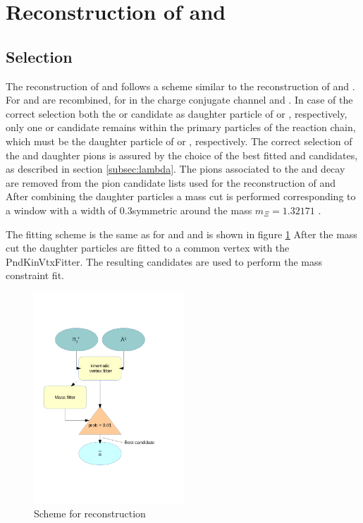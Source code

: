 		
		
		
	
\section{Reconstruction of \cascade and \anticascade}
	\subsection*{Selection}
		The reconstruction of \cascade and \anticascade follows a scheme similar to the reconstruction of \lam and \alam.
		For \anticascade \alam and \piplus are recombined, for \cascade in the charge conjugate channel \lam and \piminus.
		In case of the correct selection both the \piminus or \piplus candidate as daughter particle of \lam or \alam, respectively,
		only one \piminus or \piplus candidate remains within the primary particles of the reaction chain, which must be the daughter 
		particle of \cascade or \anticascade, respectively.
		The correct selection of the \lam and \alam daughter pions is assured by the choice of the best fitted \lam and \alam candidates, 
		as described in section \ref{subsec:lambda}.
		The pions associated to the \lam and \alam decay are removed from the pion candidate lists used for the reconstruction of \cascade and \anticascade
		After combining the daughter particles a mass cut is performed corresponding to a window with a width of $0.3$\massunit symmetric around 
		the \cascade mass $m_{\Xi} = 1.32171$ \massunit \cite{PDG}.
		 
		The fitting scheme is the same as for \lam and \alam and is shown in figure \ref{fig:anticascade_scheme} 
		After the mass cut the daughter particles are fitted to a common vertex with the PndKinVtxFitter.
		The resulting candidates are used to perform the mass constraint fit. 
		
		\begin{figure}
			\centering
				\includegraphics[width=0.50\textwidth]{./plots/combineAntiCascade.pdf}
			\caption{\propose Scheme for \anticascade reconstruction}
			\label{fig:anticascade_scheme}
		\end{figure}
		
